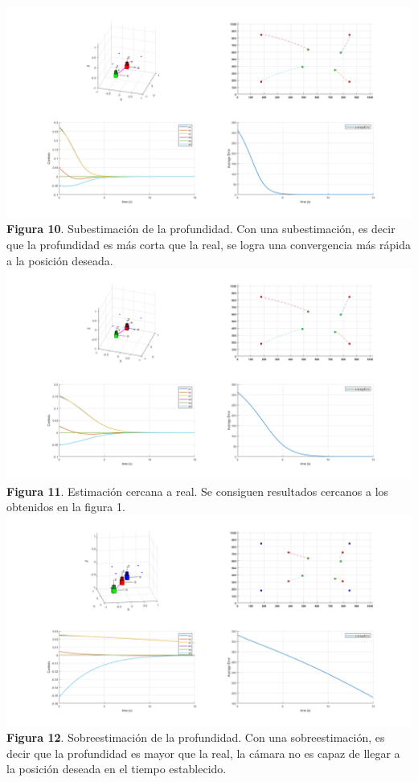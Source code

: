 \documentclass{article}
\begin{document}
	\begin{center}
	\includegraphics[scale=0.3]{fig4_3.png}\\
	{\footnotesize \textbf{Figura 10}. Subestimaci\'on de la profundidad. Con una subestimaci\'on, es decir que la profundidad es m\'as corta que la real, se logra una convergencia m\'as r\'apida a la posici\'on deseada.}\\
	\includegraphics[scale=0.3]{fig4_2.png}\\
	{\footnotesize \textbf{Figura 11}. Estimaci\'on cercana a real. Se consiguen resultados cercanos a los obtenidos en la figura 1.}\\
	\includegraphics[scale=0.3]{fig4_1.png}\\
	{\footnotesize \textbf{Figura 12}. Sobreestimaci\'on de la profundidad. Con una sobreestimaci\'on, es decir que la profundidad es mayor que la real, la c\'amara no es capaz de llegar a la posici\'on deseada en el tiempo establecido.}\\
	\end{center}
	
\end{document}
